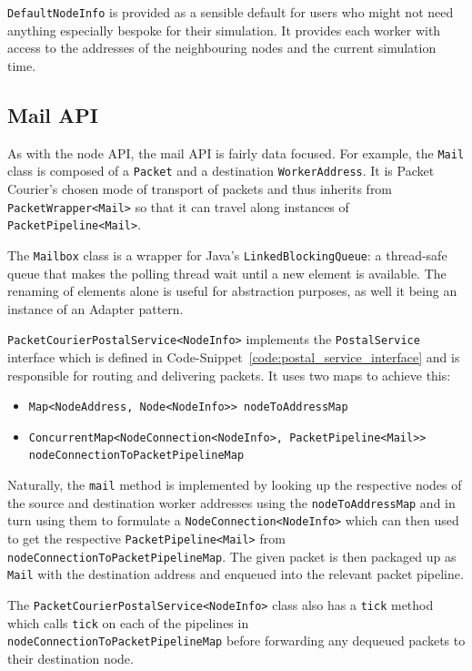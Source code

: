 \texttt{DefaultNodeInfo} is provided as a sensible default for users who might not need anything especially bespoke
for their simulation. It provides each worker with access to the addresses of the neighbouring nodes and the current
simulation time.

\subsection{Mail API}

As with the node API, the mail API is fairly data focused. For example, the \texttt{Mail} class is composed of a
\texttt{Packet} and a destination \texttt{WorkerAddress}. It is Packet Courier's chosen mode of transport of packets
and thus inherits from \texttt{PacketWrapper<Mail>} so that it can travel along instances of
\texttt{PacketPipeline<Mail>}.

The \texttt{Mailbox} class is a wrapper for Java's \texttt{LinkedBlockingQueue}\cite{java_LinkedBlockingQueue}: a
thread-safe queue that makes the polling thread wait until a new element is available. The renaming of elements alone
is useful for abstraction purposes, as well it being an instance of an Adapter pattern\cite{adapter_pattern}.

\texttt{PacketCourierPostalService<NodeInfo>} implements the \texttt{PostalService} interface which is defined in
Code-Snippet~\ref{code:postal_service_interface} and is responsible for routing and delivering packets. It uses two
maps to achieve this:
\begin{itemize}
    \item \texttt{Map<NodeAddress, Node<NodeInfo>> nodeToAddressMap}
    \item \texttt{ConcurrentMap<NodeConnection<NodeInfo>, PacketPipeline<Mail>>}
    \texttt{nodeConnectionToPacketPipelineMap}
\end{itemize}

Naturally, the \texttt{mail} method is implemented by looking up the respective nodes of the source and destination
worker addresses using the \texttt{nodeToAddressMap} and in turn using them to formulate a
\texttt{NodeConnection<NodeInfo>} which can then used to get the respective \texttt{PacketPipeline<Mail>} from
\texttt{nodeConnectionToPacketPipelineMap}. The given packet is then packaged up as \texttt{Mail} with the
destination address and enqueued into the relevant packet pipeline.

The \texttt{PacketCourierPostalService<NodeInfo>} class also has a \texttt{tick} method which calls \texttt{tick} on
each of the pipelines in \texttt{nodeConnectionToPacketPipelineMap} before forwarding any dequeued packets to their
destination node.

